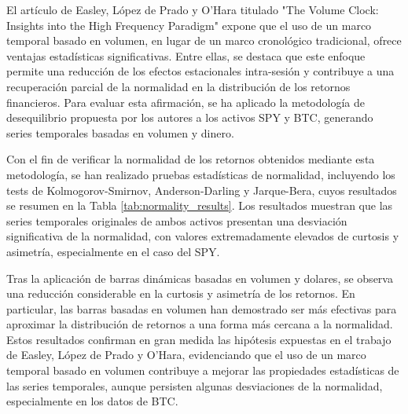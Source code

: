 \documentclass[a4paper,12pt]{report}
\begin{document}
El artículo de Easley, López de Prado y O'Hara titulado "The Volume Clock: Insights into the High Frequency 
Paradigm" \cite{easley2012volume} expone que el uso de un marco temporal basado en volumen, en lugar de un 
marco cronológico tradicional, ofrece ventajas estadísticas significativas. Entre ellas, se destaca que 
este enfoque permite una reducción de los efectos estacionales intra-sesión y contribuye a una recuperación 
parcial de la normalidad en la distribución de los retornos financieros. Para evaluar esta afirmación, se 
ha aplicado la metodología de desequilibrio propuesta por los autores a los activos SPY y BTC, generando 
series temporales basadas en volumen y dinero.

Con el fin de verificar la normalidad de los retornos obtenidos mediante esta metodología, se han realizado 
pruebas estadísticas de normalidad, incluyendo los tests de Kolmogorov-Smirnov, Anderson-Darling y Jarque-Bera, 
cuyos resultados se resumen en la Tabla \ref{tab:normality_results}. Los resultados muestran que las series 
temporales originales de ambos activos presentan una desviación significativa de la normalidad, con valores 
extremadamente elevados de curtosis y asimetría, especialmente en el caso del SPY. 

Tras la aplicación de barras dinámicas basadas en volumen y dolares, se observa una reducción considerable 
en la curtosis y asimetría de los retornos. En particular, las barras basadas en volumen han demostrado 
ser más efectivas para aproximar la distribución de retornos a una forma más cercana a la normalidad. 
Estos resultados confirman en gran medida las hipótesis expuestas en el trabajo de Easley, López de Prado y O'Hara, 
evidenciando que el uso de un marco temporal basado en volumen contribuye a mejorar las propiedades 
estadísticas de las series temporales, aunque persisten algunas desviaciones de la normalidad, 
especialmente en los datos de BTC.
\end{document}

